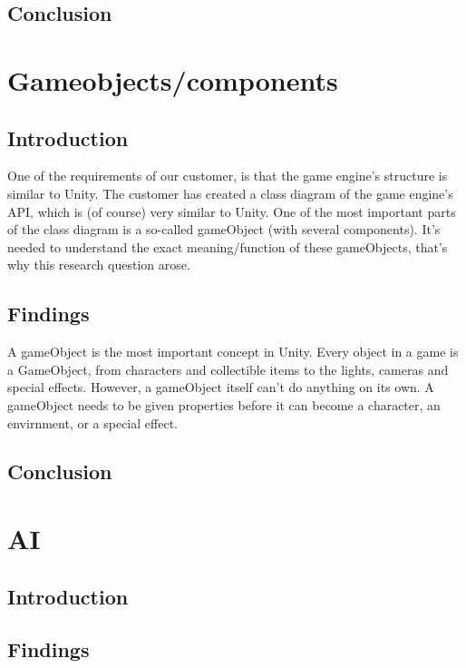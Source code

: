 \documentclass{projdoc}
\begin{document}
\subsection{Conclusion}

\section{Gameobjects/components}

\subsection{Introduction}

One of the requirements of our customer, is that the game engine's structure is
similar to Unity. The customer has created a class diagram of the game engine's API,
which is (of course) very similar to Unity. One of the most important parts of the
class diagram is a so-called gameObject (with several components). It's needed to
understand the exact meaning/function of these gameObjects, that's why this research
question arose.

\subsection{Findings}

A gameObject is the most important concept in Unity. Every object in a game is a
GameObject, from characters and collectible items to the lights, cameras and special
effects. However, a gameObject itself can't do anything on its own. A gameObject
needs to be given properties before it can become a character, an envirnment, or a
special effect.

\subsection{Conclusion}

\section{AI}

\subsection{Introduction}

\subsection{Findings}
\end{document}
